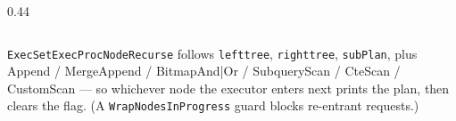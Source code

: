 \begin{frame}
\begin{columns}[T]
\begin{column}{0.44\textwidth}

\end{column}
\end{columns}

\vspace{2mm}
{\footnotesize \texttt{ExecSetExecProcNodeRecurse} follows
\texttt{lefttree}, \texttt{righttree}, \texttt{subPlan}, plus
Append / MergeAppend / BitmapAnd|Or / SubqueryScan / CteScan / CustomScan
--- so whichever node the executor enters next prints the plan, then
clears the flag. (A \texttt{WrapNodesInProgress} guard blocks re-entrant
requests.)}
\end{frame}

